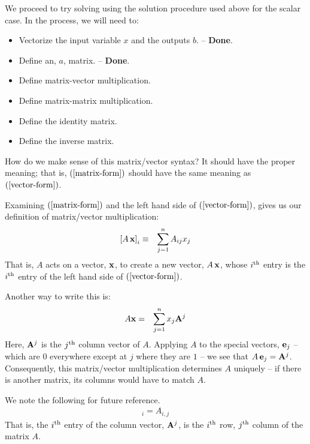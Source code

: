 \documentclass{article}
\begin{document}
We proceed to try solving using the solution procedure used above for the scalar case.
In the process, we will need to:
\begin{itemize}
    \item{Vectorize the input variable $x$ and the outputs $b$. -- {\bf Done}.}
    \item{Define an, $a$, matrix. -- {\bf Done}.}
    \item{Define matrix-vector multiplication.}
    \item{Define matrix-matrix multiplication.}
    \item{Define the identity matrix.}
    \item{Define the inverse matrix.}
\end{itemize}

How do we make sense of this matrix/vector syntax? It should have
the proper meaning; that is, $(\ref{matrix-form})$
should have the same meaning as $(\ref{vector-form})$.

Examining $(\ref{matrix-form})$ and the left hand side of
$(\ref{vector-form})$, gives us our definition of matrix/vector multiplication:
\begin{eqnarray}
  \left[A \, {\bf x}\right]_i & \equiv & \sum_{j=1}^n A_{ij} x_j
                                         \label{matrix-vector-mult}
\end{eqnarray}
That is, $A$ acts on a vector, ${\bf x}$, to create a new vector, $A \, {\bf x}$,
whose $i^{\rm th}$ entry is the $i^{\rm th}$ entry of
the left hand side of $(\ref{vector-form})$.

Another way to write this is:
\begin{eqnarray}
  A {\bf x} & = & \sum_{j=1}^n x_j {\bf A}^j
\end{eqnarray}
Here, ${\bf A}^j$ is the $j^{\rm th}$ column vector of $A$. Applying $A$ to the special
vectors, ${\bf e}_j$
-- which are $0$ everywhere except at $j$ where they are $1$ --
we see that $A \, {\bf e}_j = {\bf A}^j$. 
Consequently, this matrix/vector
multiplication determines $A$ uniquely
-- if there is another matrix, its columns would have to match $A$.

We note the following for future reference.
\begin{eqnarray}
	[{\bf A}^j]_i = A_{i, j} \label{vec-matrix-index}
\end{eqnarray}
That is, the $i^{\rm th}$ entry of the column vector, ${\bf A}^j$, is the
$i^{\rm th}$ row,  $j^{\rm th}$ column of the matrix $A$. 
\end{document}
